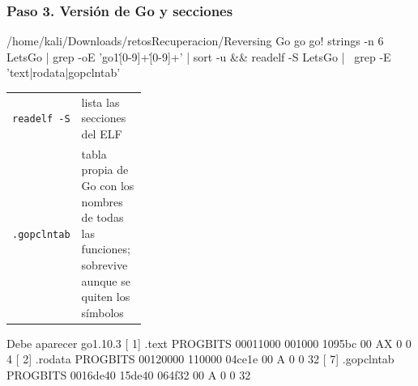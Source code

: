 \documentclass[11pt,a4paper]{article}
\begin{document}
\subsubsection*{Paso 3. Versión de Go y secciones}
\begin{comando}{/home/kali/Downloads/retosRecuperacion/Reversing Go go go!}
strings -n 6 LetsGo | grep -oE 'go1\.[0-9]+\.[0-9]+' | sort -u && readelf -S LetsGo | \
  grep -E 'text|rodata|gopclntab'
\end{comando}
\begin{tcolorbox}[enhanced, breakable, colback=gray!3, colframe=gray!35, boxrule=0.3pt, arc=1pt, left=4pt, right=4pt, top=2pt, bottom=2pt, fonttitle=\sffamily\scriptsize\bfseries, coltitle=black!70, colbacktitle=gray!10, title={Qué hace cada parte}, attach title to upper, before skip=2pt, after skip=4pt, fontupper=\small]
\par{\renewcommand{\arraystretch}{1.12}\begin{tabularx}{\linewidth}{@{}>{\raggedright\arraybackslash}p{0.33\linewidth}>{\raggedright\arraybackslash}X@{}}
\texttt{readelf -S} & lista las secciones del ELF \\
\texttt{.gopclntab} & tabla propia de Go con los nombres de todas las funciones; sobrevive aunque se quiten los símbolos \\
\end{tabularx}}
\end{tcolorbox}
\begin{salida}{Debe aparecer}
go1.10.3
  [ 1] .text             PROGBITS        00011000 001000 1095bc 00  AX  0   0  4
  [ 2] .rodata           PROGBITS        00120000 110000 04ce1e 00   A  0   0 32
  [ 7] .gopclntab        PROGBITS        0016de40 15de40 064f32 00   A  0   0 32
\end{salida}
\end{document}
